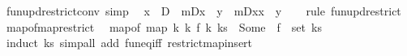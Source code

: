 \begin{isabellebody}
\endisatagproof
{\isafoldproof}%
%
\isadelimproof
\isanewline
%
\endisadelimproof
\isanewline
{}\isamarkupfalse%
\ fun{\isacharunderscore}{\kern0pt}upd{\isacharunderscore}{\kern0pt}restrict{\isacharunderscore}{\kern0pt}conv\ {\isacharbrackleft}{\kern0pt}simp{\isacharbrackright}{\kern0pt}{\isacharcolon}{\kern0pt}\isanewline
\ \ {\isachardoublequoteopen}x\ {\isasymin}\ D\ {\isasymLongrightarrow}\ {\isacharparenleft}{\kern0pt}m{\isacharbar}{\kern0pt}{\isacharbackquote}{\kern0pt}D{\isacharparenright}{\kern0pt}{\isacharparenleft}{\kern0pt}x\ {\isacharcolon}{\kern0pt}{\isacharequal}{\kern0pt}\ y{\isacharparenright}{\kern0pt}\ {\isacharequal}{\kern0pt}\ {\isacharparenleft}{\kern0pt}m{\isacharbar}{\kern0pt}{\isacharbackquote}{\kern0pt}{\isacharparenleft}{\kern0pt}D{\isacharminus}{\kern0pt}{\isacharbraceleft}{\kern0pt}x{\isacharbraceright}{\kern0pt}{\isacharparenright}{\kern0pt}{\isacharparenright}{\kern0pt}{\isacharparenleft}{\kern0pt}x\ {\isacharcolon}{\kern0pt}{\isacharequal}{\kern0pt}\ y{\isacharparenright}{\kern0pt}{\isachardoublequoteclose}\isanewline
%
\isadelimproof
\ \ %
\endisadelimproof
%
\isatagproof
{}\isamarkupfalse%
\ {\isacharparenleft}{\kern0pt}rule\ fun{\isacharunderscore}{\kern0pt}upd{\isacharunderscore}{\kern0pt}restrict{\isacharparenright}{\kern0pt}%
\endisatagproof
{\isafoldproof}%
%
\isadelimproof
\isanewline
%
\endisadelimproof
\isanewline
{}\isamarkupfalse%
\ map{\isacharunderscore}{\kern0pt}of{\isacharunderscore}{\kern0pt}map{\isacharunderscore}{\kern0pt}restrict{\isacharcolon}{\kern0pt}\isanewline
\ \ {\isachardoublequoteopen}map{\isacharunderscore}{\kern0pt}of\ {\isacharparenleft}{\kern0pt}map\ {\isacharparenleft}{\kern0pt}{\isasymlambda}k{\isachardot}{\kern0pt}\ {\isacharparenleft}{\kern0pt}k{\isacharcomma}{\kern0pt}\ f\ k{\isacharparenright}{\kern0pt}{\isacharparenright}{\kern0pt}\ ks{\isacharparenright}{\kern0pt}\ {\isacharequal}{\kern0pt}\ {\isacharparenleft}{\kern0pt}Some\ {\isasymcirc}\ f{\isacharparenright}{\kern0pt}\ {\isacharbar}{\kern0pt}{\isacharbackquote}{\kern0pt}\ set\ ks{\isachardoublequoteclose}\isanewline
%
\isadelimproof
\ \ %
\endisadelimproof
%
\isatagproof
{}\isamarkupfalse%
\ {\isacharparenleft}{\kern0pt}induct\ ks{\isacharparenright}{\kern0pt}\ {\isacharparenleft}{\kern0pt}simp{\isacharunderscore}{\kern0pt}all\ add{\isacharcolon}{\kern0pt}\ fun{\isacharunderscore}{\kern0pt}eq{\isacharunderscore}{\kern0pt}iff\ restrict{\isacharunderscore}{\kern0pt}map{\isacharunderscore}{\kern0pt}insert{\isacharparenright}{\kern0pt}%
\endisatagproof
{\isafoldproof}%
%
\isadelimproof

\end{isabellebody}
